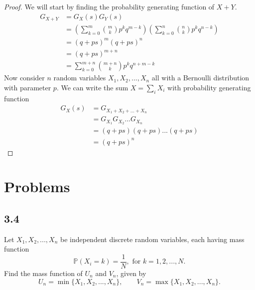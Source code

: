 \documentclass{article}
\renewcommand{\P}[1]{\mathbb{P}(#1)}
\begin{document}
\begin{proof}
    We will start by finding the probability generating function of $X+Y$.
    \begin{align*}
        G_{X+Y} & = G_X(s) G_Y(s)                                     \\
                & = \left(\sum_{k=0}^m\binom{m}{k} p^k q^{m-k}\right)
        \left(\sum_{k=0}^n \binom{n}{k} p^k q^{n-k} \right)           \\
                & =  (q + ps)^m(q + ps)^n                             \\
                & = (q + ps)^{m+n}                                    \\
                & = \sum_{k=0}^{m+n}\binom{m+n}{k}p^k q^{n+m -k}
    \end{align*}
    Now consider $n$ random variables $X_1, X_2, ..., X_n$ all with a Bernoulli
    distribution with parameter $p$. We can write the sum $X = \sum_i X_i$
    with probability generating function
    \begin{align*}
        G_X (s) & = G_{X_1 + X_2 + ... + X_n}   \\
                & = G_{X_1}G_{X_2}...G_{X_n}    \\
                & = (q + ps)(q + ps)...(q + ps) \\
                & = (q+ps)^n
    \end{align*}
\end{proof}
\section*{Problems}
\subsection*{3.4} %
Let $X_1, X_2,...,X_n$ be independent discrete random variables, each having mass function
$$ \P{X_i = k} = \frac{1}{N}, \text{ for } k = 1,2,...,N.$$
Find the mass function of $U_n$ and $V_n$, given by
$$U_n= \min\{X_1,X_2,...,X_n\}, \qquad V_n= \max\{X_1,X_2,...,X_n\}.$$
\end{document}
